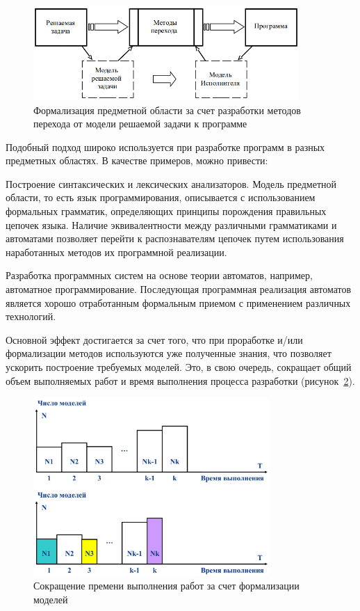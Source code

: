 \begin{figure}[htbp]
    \centering
    \includegraphics[width=0.9\textwidth]{img/fig01-03a.png}
    \caption{Формализация предметной области за счет разработки методов перехода от модели решаемой задачи к программе}
    \label{fig01-03a}
\end{figure}

Подобный подход широко используется при разработке программ в разных предметных областях. В качестве примеров, можно привести:

Построение синтаксических и лексических анализаторов. Модель предметной области, то есть язык программирования, описывается с использованием формальных грамматик, определяющих принципы порождения правильных цепочек языка. Наличие эквивалентности между различными грамматиками и автоматами позволяет перейти к распознавателям цепочек путем использования наработанных методов их программной реализации.

Разработка программных систем на основе теории автоматов, например, автоматное программирование. Последующая программная реализация автоматов является хорошо отработанным формальным приемом с применением различных технологий.

Основной эффект достигается за счет того, что при проработке и/или формализации методов используются уже полученные знания, что позволяет ускорить построение требуемых моделей. Это, в свою очередь, сокращает общий объем выполняемых работ и время выполнения процесса разработки (рисунок~\ref{fdiag02}).

\begin{figure}[htbp]
    \centering
    \includegraphics[width=0.8\textwidth]{img/fdiag02.png}
    \caption{Сокращение премени выполнения работ за счет формализации моделей}
    \label{fdiag02}
\end{figure}


